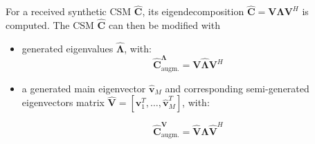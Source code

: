 \documentclass[12pt,pdftex,16x10]{elpres} %
\begin{document}
\begin{psli}
\begin{table}[h]
\begin{minipage}[b][0.3\textheight][t]{0.45\textwidth}
    \end{minipage}
    \begin{minipage}[b][0.3\textheight][t]{0.45\textwidth}
        \caption{Discriminator}
    \end{minipage}
  \end{table}
\end{psli}

\begin{psli}
  
  For a received synthetic CSM $\mathbf{\hat{C}}$, its  eigendecomposition $\mathbf{\hat{C}} = \mathbf{V} \mathbf{\Lambda} \mathbf{V}^H$ is computed. The CSM $\mathbf{\hat{C}}$ can then be modified with
  
  \begin{itemize}
    \item generated eigenvalues $\hat{\mathbf{\Lambda}}$, with:
    \begin{equation}
        \mathbf{\hat{C}}_\text{augm.}^{\mathbf{\Lambda}}  = \mathbf{V} \hat{\mathbf{\Lambda}} \mathbf{V}^H
    \end{equation}

    \item a generated main eigenvector $\hat{\mathbf{v}}_M$ and corresponding semi-generated eigenvectors matrix $\hat{\mathbf{V}} = [\mathbf{v}_1^T, \dots, \hat{\mathbf{v}}_M^T]$, with:

    \begin{equation}
        \mathbf{\hat{C}}_\text{augm.}^{\mathbf{V}}  = \hat{\mathbf{V}} \mathbf{\Lambda} \hat{\mathbf{V}}^H
    \end{equation}

  \end{itemize}

\end{psli}
\end{document}

